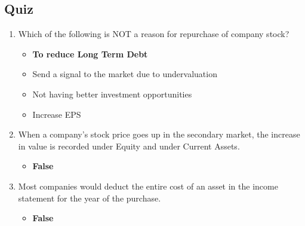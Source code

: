 \begin{tiny}
  \subsection{Quiz}
  \begin{enumerate}[itemsep=-0.5em]
    \item Which of the following is NOT a reason for repurchase of company stock?
          \begin{itemize}[itemsep=-0.2em]
            \item \textbf{To reduce Long Term Debt}
            \item Send a signal to the market due to undervaluation
            \item Not having better investment opportunities
            \item Increase EPS
          \end{itemize}
    \item When a company's stock price goes up in the secondary market, the increase in value is recorded under Equity and under Current Assets.
          \begin{itemize}[itemsep=-0.2em]
            \item \textbf{False}
          \end{itemize}
    \item Most companies would deduct the entire cost of an asset in the income statement for the year of the purchase.
          \begin{itemize}[itemsep=-0.2em]
            \item \textbf{False}
          \end{itemize}
  \end{enumerate}

\end{tiny}

